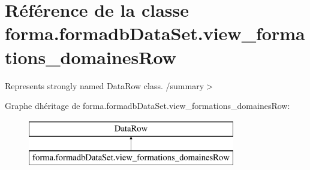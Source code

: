 \hypertarget{classforma_1_1formadb_data_set_1_1view__formations__domaines_row}{}\section{Référence de la classe forma.\+formadb\+Data\+Set.\+view\+\_\+formations\+\_\+domaines\+Row}
\label{classforma_1_1formadb_data_set_1_1view__formations__domaines_row}


Represents strongly named Data\+Row class. /summary$>$  


Graphe d\textquotesingle{}héritage de forma.\+formadb\+Data\+Set.\+view\+\_\+formations\+\_\+domaines\+Row\+:\begin{figure}[H]
\begin{center}
\leavevmode
\includegraphics[height=2.000000cm]{classforma_1_1formadb_data_set_1_1view__formations__domaines_row}
\end{center}
\end{figure}
